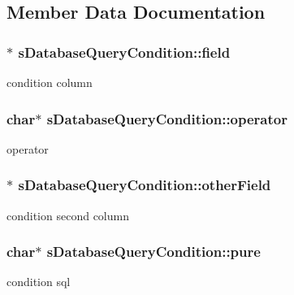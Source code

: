 \subsection{Member Data Documentation}
\subsubsection[{\texorpdfstring{field}{field}}]{$\ast$ s\+Database\+Query\+Condition\+::field}\hypertarget{structsDatabaseQueryCondition_a0899760067fd45e1e4a8924eed57e819}{}\label{structsDatabaseQueryCondition_a0899760067fd45e1e4a8924eed57e819}
condition column 
\subsubsection[{\texorpdfstring{operator}{operator}}]{\setlength{\rightskip}{0pt plus 5cm}char$\ast$ s\+Database\+Query\+Condition\+::operator}\hypertarget{structsDatabaseQueryCondition_aa252b90ac14f012ce02078dda403309d}{}\label{structsDatabaseQueryCondition_aa252b90ac14f012ce02078dda403309d}
operator 
\subsubsection[{\texorpdfstring{other\+Field}{otherField}}]{$\ast$ s\+Database\+Query\+Condition\+::other\+Field}\hypertarget{structsDatabaseQueryCondition_aabc526568a4ba78b32ca64982bbd4813}{}\label{structsDatabaseQueryCondition_aabc526568a4ba78b32ca64982bbd4813}
condition second column 
\subsubsection[{\texorpdfstring{pure}{pure}}]{\setlength{\rightskip}{0pt plus 5cm}char$\ast$ s\+Database\+Query\+Condition\+::pure}\hypertarget{structsDatabaseQueryCondition_ad17cff86f0e111e5d465675dc1e804a5}{}\label{structsDatabaseQueryCondition_ad17cff86f0e111e5d465675dc1e804a5}
condition sql 
